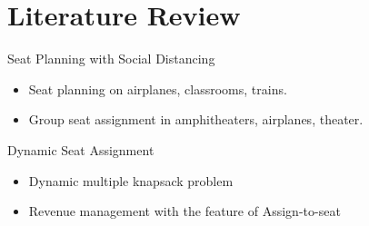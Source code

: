 
\section{Literature Review}
    \frame{\sectionpage}

    \begin{frame}{Seat Planning with Social Distancing}
      \begin{itemize}
        \item Seat planning on airplanes, classrooms, trains.
        \vspace*{2cm}
        \item Group seat assignment in amphitheaters, airplanes, theater.
      \end{itemize}
      \end{frame}
      
      \begin{frame}{Dynamic Seat Assignment}
        \begin{itemize}
          \item Dynamic multiple knapsack problem
          \vspace*{2cm}
          \item Revenue management with the feature of Assign-to-seat
        \end{itemize}
      \end{frame}